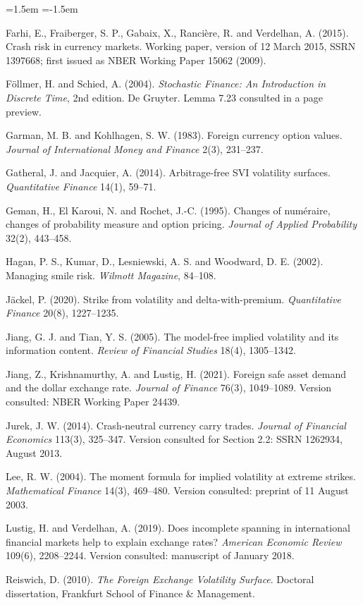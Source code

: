 \documentclass[11pt]{article}
\theoremstyle{remark}
\begin{document}
\begin{list}{}{\leftmargin=1.5em \itemindent=-1.5em \itemsep=2pt \parsep=0pt}
\item Farhi, E., Fraiberger, S. P., Gabaix, X., Ranci\`ere, R. and Verdelhan, A. (2015). Crash risk in currency markets. Working paper, version of 12 March 2015, SSRN 1397668; first issued as NBER Working Paper 15062 (2009).
\item F\"ollmer, H. and Schied, A. (2004). \emph{Stochastic Finance: An Introduction in Discrete Time}, 2nd edition. De Gruyter. Lemma 7.23 consulted in a page preview.
\item Garman, M. B. and Kohlhagen, S. W. (1983). Foreign currency option values. \emph{Journal of International Money and Finance} 2(3), 231--237.
\item Gatheral, J. and Jacquier, A. (2014). Arbitrage-free SVI volatility surfaces. \emph{Quantitative Finance} 14(1), 59--71.
\item Geman, H., El Karoui, N. and Rochet, J.-C. (1995). Changes of num\'eraire, changes of probability measure and option pricing. \emph{Journal of Applied Probability} 32(2), 443--458.
\item Hagan, P. S., Kumar, D., Lesniewski, A. S. and Woodward, D. E. (2002). Managing smile risk. \emph{Wilmott Magazine}, 84--108.
\item J\"ackel, P. (2020). Strike from volatility and delta-with-premium. \emph{Quantitative Finance} 20(8), 1227--1235.
\item Jiang, G. J. and Tian, Y. S. (2005). The model-free implied volatility and its information content. \emph{Review of Financial Studies} 18(4), 1305--1342.
\item Jiang, Z., Krishnamurthy, A. and Lustig, H. (2021). Foreign safe asset demand and the dollar exchange rate. \emph{Journal of Finance} 76(3), 1049--1089. Version consulted: NBER Working Paper 24439.
\item Jurek, J. W. (2014). Crash-neutral currency carry trades. \emph{Journal of Financial Economics} 113(3), 325--347. Version consulted for Section 2.2: SSRN 1262934, August 2013.
\item Lee, R. W. (2004). The moment formula for implied volatility at extreme strikes. \emph{Mathematical Finance} 14(3), 469--480. Version consulted: preprint of 11 August 2003.
\item Lustig, H. and Verdelhan, A. (2019). Does incomplete spanning in international financial markets help to explain exchange rates? \emph{American Economic Review} 109(6), 2208--2244. Version consulted: manuscript of January 2018.
\item Reiswich, D. (2010). \emph{The Foreign Exchange Volatility Surface}. Doctoral dissertation, Frankfurt School of Finance \& Management.

\end{list}
\end{document}
